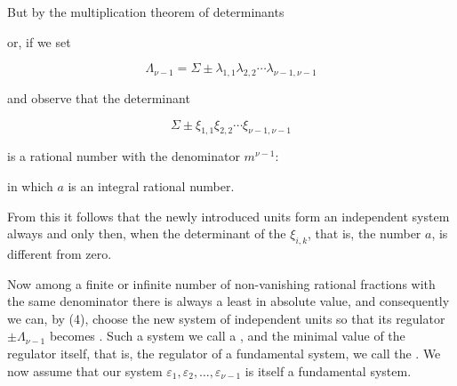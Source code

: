 But by the multiplication theorem of determinants


or, if we set

\[
\Lambda_{\nu-1} = \Sigma \pm \lambda_{1,1}\lambda_{2,2} \cdots \lambda_{\nu-1,\nu-1}
\]

and observe that the determinant

\[
\Sigma \pm \xi_{1,1}\xi_{2,2} \cdots \xi_{\nu-1,\nu-1}
\]

is a rational number with the denominator $m^{\nu-1}$:


in which $a$ is an integral rational number.

From this it follows that the newly introduced units form an
independent system always and only then, when the
determinant of the $\xi_{i,k}$, that is, the number $a$, is different from zero.

Now among a finite or infinite number of
non-vanishing rational fractions with the same denominator
there is always a least in absolute value, and consequently
we can, by (4), choose the new system of independent units
so that its regulator $\pm \Lambda_{\nu-1}$ becomes .
Such a system we call a , and the minimal value of the regulator itself,
that is, the regulator of a fundamental system, we call the
. We now assume that our
system $\varepsilon_1, \varepsilon_2, \ldots, \varepsilon_{\nu-1}$ is itself a fundamental system.


